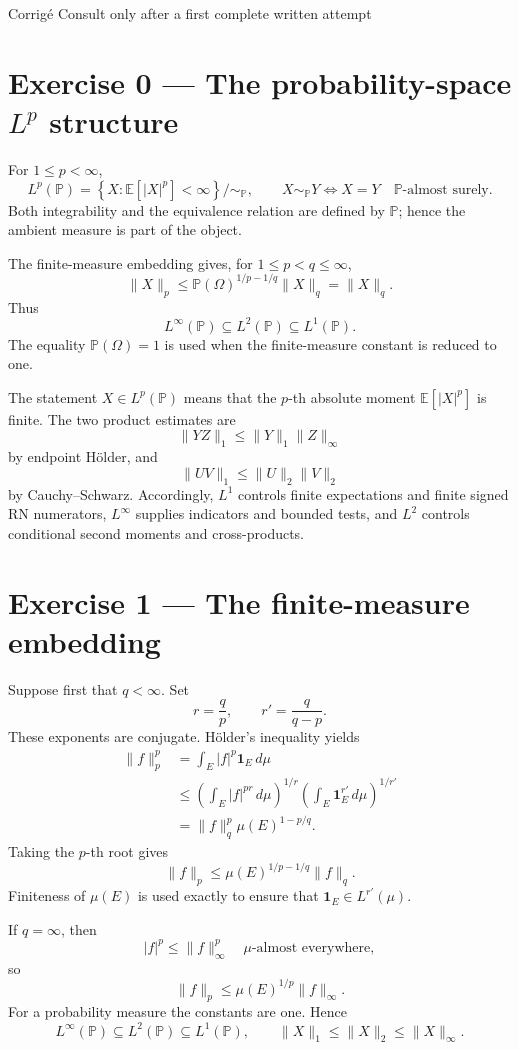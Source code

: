 
\sheettitle
  {Corrigé}
  {Consult only after a first complete written attempt}

\section*{Exercise 0 — The probability-space $L^p$ structure}

For $1\le p<\infty$,
\[
L^p(\mathbb P)
=
\left\{
X:\mathbb E[|X|^p]<\infty
\right\}\big/\!\sim_{\mathbb P},
\qquad
X\sim_{\mathbb P}Y
\Longleftrightarrow
X=Y\quad\mathbb P\text{-almost surely}.
\]
Both integrability and the equivalence relation are defined by $\mathbb P$; hence the ambient measure is part of the object.

The finite-measure embedding gives, for $1\le p<q\le\infty$,
\[
\|X\|_p
\le
\mathbb P(\Omega)^{1/p-1/q}\|X\|_q
=
\|X\|_q.
\]
Thus
\[
L^\infty(\mathbb P)
\subseteq
L^2(\mathbb P)
\subseteq
L^1(\mathbb P).
\]
The equality $\mathbb P(\Omega)=1$ is used when the finite-measure constant is reduced to one.

The statement $X\in L^p(\mathbb P)$ means that the $p$-th absolute moment $\mathbb E[|X|^p]$ is finite. The two product estimates are
\[
\|YZ\|_1
\le
\|Y\|_1\|Z\|_\infty
\]
by endpoint Hölder, and
\[
\|UV\|_1
\le
\|U\|_2\|V\|_2
\]
by Cauchy--Schwarz. Accordingly, $L^1$ controls finite expectations and finite signed RN numerators, $L^\infty$ supplies indicators and bounded tests, and $L^2$ controls conditional second moments and cross-products.

\section*{Exercise 1 — The finite-measure embedding}

Suppose first that $q<\infty$. Set
\[
r=\frac qp,
\qquad
r'=\frac q{q-p}.
\]
These exponents are conjugate. Hölder's inequality yields
\[
\begin{aligned}
\|f\|_p^p
&=
\int_E |f|^p\mathbf 1_E\,d\mu\\
&\le
\left(\int_E|f|^{pr}\,d\mu\right)^{1/r}
\left(\int_E\mathbf 1_E^{r'}\,d\mu\right)^{1/r'}\\
&=
\|f\|_q^p\mu(E)^{1-p/q}.
\end{aligned}
\]
Taking the $p$-th root gives
\[
\|f\|_p
\le
\mu(E)^{1/p-1/q}\|f\|_q.
\]
Finiteness of $\mu(E)$ is used exactly to ensure that $\mathbf 1_E\in L^{r'}(\mu)$.

If $q=\infty$, then
\[
|f|^p
\le
\|f\|_\infty^p
\quad\mu\text{-almost everywhere},
\]
so
\[
\|f\|_p
\le
\mu(E)^{1/p}\|f\|_\infty.
\]
For a probability measure the constants are one. Hence
\[
L^\infty(\mathbb P)
\subseteq
L^2(\mathbb P)
\subseteq
L^1(\mathbb P),
\qquad
\|X\|_1\le\|X\|_2\le\|X\|_\infty.
\]


